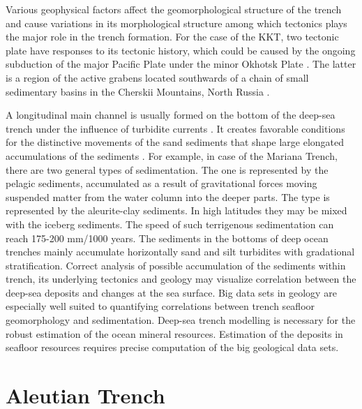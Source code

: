 \documentclass[11pt,a4paper]{report}
\begin{document}
{Various geophysical factors affect the geomorphological structure of the trench and cause variations in its morphological structure among which tectonics plays the major role in the trench formation. For the case of the \ac{KKT}, two tectonic plate have responses to its tectonic history, which could be caused by the ongoing subduction of the major Pacific Plate under the minor Okhotsk Plate \cite{Bird2003}. The latter is a region of the active grabens located southwards of a chain of small sedimentary basins in the Cherskii Mountains, North Russia \cite{Savostinetal1983}. 

A longitudinal main channel is usually formed on the bottom of the deep-sea trench under the influence of turbidite currents \cite{Pabstetal2012}. It creates favorable conditions for the distinctive movements of the sand sediments that shape large elongated accumulations of the sediments \cite{Ernst2001}. For example, in case of the Mariana Trench, there are two general types of sedimentation. The  one is represented by the pelagic sediments, accumulated as a result of gravitational forces moving suspended matter from the water column into the deeper parts. The  type is represented by the aleurite-clay sediments. In high latitudes they may be mixed with the iceberg sediments. The speed of such terrigenous sedimentation can reach 175-200 mm/1000 years. The sediments in the bottoms of deep ocean trenches mainly accumulate horizontally sand and silt turbidites with gradational stratification. Correct analysis of possible accumulation of the sediments within trench, its underlying tectonics and geology may visualize correlation between the deep-sea deposits and changes at the sea surface. Big data sets in geology are especially well suited to quantifying correlations between trench seafloor geomorphology and sedimentation. Deep-sea trench modelling is necessary for the robust estimation of the ocean mineral resources. Estimation of the deposits in seafloor resources requires precise computation of the big geological data sets. 


\pagebreak	
\section{Aleutian Trench}

}
\end{document}
